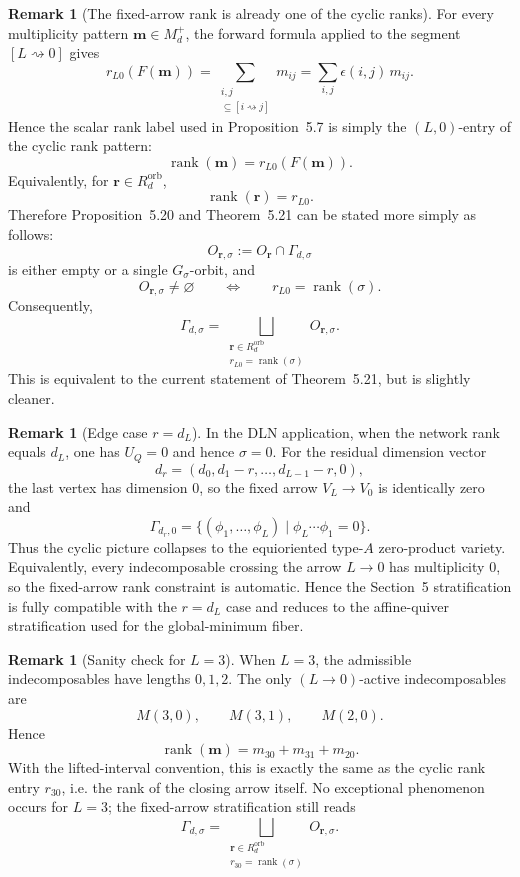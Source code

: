\documentclass{article}
\newcommand{\rank}{\operatorname{rank}}
\theoremstyle{definition}
\newtheorem{remark}[theorem]{Remark}
\begin{document}
\begin{remark}[The fixed-arrow rank is already one of the cyclic ranks]
For every multiplicity pattern \(\mathbf m\in M_d^+\), the forward formula applied to the
segment \([L\rightsquigarrow 0]\) gives
\[
r_{L0}(F(\mathbf m))
=
\sum_{\substack{i,j\\ [L\rightsquigarrow 0]\subseteq [i\rightsquigarrow j]}} m_{ij}
=
\sum_{i,j}\epsilon(i,j)\,m_{ij}.
\]
Hence the scalar rank label used in Proposition~5.7 is simply the \((L,0)\)-entry of the
cyclic rank pattern:
\[
\rank(\mathbf m)=r_{L0}(F(\mathbf m)).
\]
Equivalently, for \(\mathbf r\in R_d^{\mathrm{orb}}\),
\[
\rank(\mathbf r)=r_{L0}.
\]
Therefore Proposition~5.20 and Theorem~5.21 can be stated more simply as follows:
\[
O_{\mathbf r,\sigma}:=O_{\mathbf r}\cap \Gamma_{d,\sigma}
\]
is either empty or a single \(G_\sigma\)-orbit, and
\[
O_{\mathbf r,\sigma}\neq \varnothing
\qquad\Longleftrightarrow\qquad
r_{L0}=\rank(\sigma).
\]
Consequently,
\[
\Gamma_{d,\sigma}
=
\bigsqcup_{\substack{\mathbf r\in R_d^{\mathrm{orb}}\\ r_{L0}=\rank(\sigma)}}
O_{\mathbf r,\sigma}.
\]
This is equivalent to the current statement of Theorem~5.21, but is slightly cleaner.
\end{remark}

\begin{remark}[Edge case \(r=d_L\)]
In the DLN application, when the network rank equals \(d_L\), one has \(U_Q=0\) and
hence \(\sigma=0\). For the residual dimension vector
\[
d_r=(d_0,d_1-r,\ldots,d_{L-1}-r,0),
\]
the last vertex has dimension \(0\), so the fixed arrow \(V_L\to V_0\) is identically zero and
\[
\Gamma_{d_r,0}
=
\{(\phi_1,\ldots,\phi_L)\mid \phi_L\cdots \phi_1=0\}.
\]
Thus the cyclic picture collapses to the equioriented type-\(A\) zero-product variety.
Equivalently, every indecomposable crossing the arrow \(L\to 0\) has multiplicity \(0\), so
the fixed-arrow rank constraint is automatic. Hence the Section~5 stratification is fully
compatible with the \(r=d_L\) case and reduces to the affine-quiver stratification used for
the global-minimum fiber.
\end{remark}

\begin{remark}[Sanity check for \(L=3\)]
When \(L=3\), the admissible indecomposables have lengths \(0,1,2\). The only
\((L\to 0)\)-active indecomposables are
\[
M(3,0),\qquad M(3,1),\qquad M(2,0).
\]
Hence
\[
\rank(\mathbf m)=m_{30}+m_{31}+m_{20}.
\]
With the lifted-interval convention, this is exactly the same as the cyclic rank entry
\(r_{30}\), i.e. the rank of the closing arrow itself. No exceptional phenomenon occurs for
\(L=3\); the fixed-arrow stratification still reads
\[
\Gamma_{d,\sigma}
=
\bigsqcup_{\substack{\mathbf r\in R_d^{\mathrm{orb}}\\ r_{30}=\rank(\sigma)}}
O_{\mathbf r,\sigma}.
\]
\end{remark}
\end{document}
